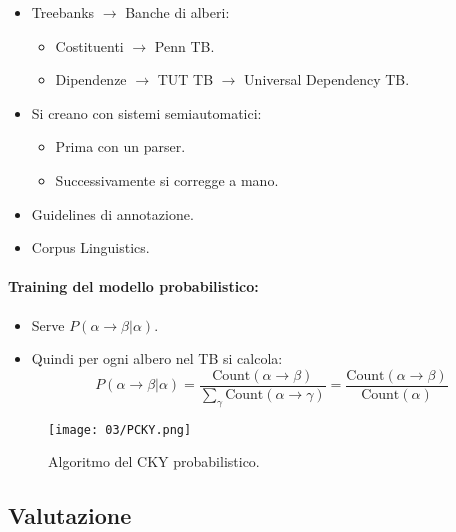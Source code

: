 

\begin{itemize}
  \item Treebanks $\rightarrow$ Banche di alberi:
    \begin{itemize}
      \item Costituenti $\rightarrow$ Penn TB. 
      \item Dipendenze $\rightarrow$ TUT TB $\rightarrow$ Universal Dependency TB.
    \end{itemize}
  \item Si creano con sistemi semiautomatici: 
    \begin{itemize}
      \item Prima con un parser. 
      \item Successivamente si corregge a mano.
    \end{itemize}
  \item Guidelines di annotazione. 
  \item Corpus Linguistics.
\end{itemize}


\paragraph{Training del modello probabilistico:}

\begin{itemize}
  \item Serve $P(\alpha \rightarrow \beta | \alpha)$. 
  \item Quindi per ogni albero nel TB si calcola: 
    $$P(\alpha \rightarrow \beta | \alpha) = \frac{\text{Count}(\alpha \rightarrow \beta)}{\sum_\gamma \text{Count}(\alpha \rightarrow \gamma)} = \frac{\text{Count}(\alpha \rightarrow \beta)}{\text{Count}(\alpha)}$$
\end{itemize}

\begin{figure}[!h]
    \centering
    \texttt{[image: 03/PCKY.png]}
    \caption{Algoritmo del CKY probabilistico.}
\end{figure}


\subsection{Valutazione}

